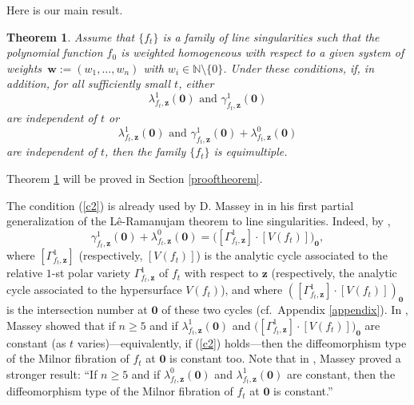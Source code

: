 \documentclass[a4paper,fleqn,11pt]{amsart}
\newtheorem{theorem}{Theorem}[section]
\theoremstyle{definition}
\theoremstyle{remark}
\numberwithin{equation}{section}
\begin{document}
Here is our main result.

\begin{theorem}\label{mt2}
Assume that $\{f_t\}$ is a family of line singularities such that the polynomial function $f_0$ is weighted homogeneous with respect to a given system of weights~$\mathbf{w}:=(w_1,\ldots,w_n)$ with $w_i\in \mathbb{N}\setminus\{0\}$. 
Under these conditions, if, in addition, 
for all sufficiently small $t$, either 
\begin{equation}\label{c1}
\lambda^1_{f_t,\mathbf{z}} (\mathbf{0}) \mbox{ and } 
\gamma^1_{f_t,\mathbf{z}} (\mathbf{0})
\end{equation} 
are independent of $t$ or 
\begin{equation}\label{c2}
\lambda^1_{f_t,\mathbf{z}} (\mathbf{0}) \mbox{ and } 
\gamma^1_{f_t,\mathbf{z}} (\mathbf{0}) + \lambda^0_{f_t,\mathbf{z}} (\mathbf{0})
\end{equation}  
are independent of $t$, then the family $\{f_t\}$ is equimultiple.
\end{theorem}

Theorem \ref{mt2} will be proved in Section \ref{prooftheorem}.

The condition (\ref{c2}) is already used by D. Massey in \cite[\S5]{M7} in his first partial generalization of the L\^e-Ramanujam theorem to line singularities. 
Indeed, by \cite[Proposition 1.23]{M}, 
\begin{displaymath}
\gamma^1_{f_t,\mathbf{z}} (\mathbf{0}) + \lambda^0_{f_t,\mathbf{z}} (\mathbf{0})
= \bigl([\Gamma^1_{f_t,\mathbf{z}}] \cdot [V(f_t)]\bigr)_{\mathbf{0}},
\end{displaymath} 
where $[\Gamma^1_{f_t,\mathbf{z}}]$ (respectively, $[V(f_t)]$) is the analytic cycle associated to the relative $1$-st polar variety $\Gamma^1_{f_t,\mathbf{z}}$ of $f_t$ with respect to $\mathbf{z}$ (respectively, the analytic cycle associated to the hypersurface $V(f_t)$), and where 
$([\Gamma^1_{f_t,\mathbf{z}}] \cdot [V(f_t)])_{\mathbf{0}}$
is the intersection number at $\mathbf{0}$ of these two cycles (cf.~Appendix \ref{appendix}). 
In \cite[Theorem (5.2)]{M7}, Massey showed that if $n\geq 5$ and if $\lambda^1_{f_t,\mathbf{z}} (\mathbf{0})$ and $\bigl([\Gamma^1_{f_t,\mathbf{z}}] \cdot [V(f_t)]\bigr)_{\mathbf{0}}$ are constant (as $t$ varies)---equivalently, if (\ref{c2}) holds---then the diffeomorphism type of the Milnor fibration of $f_t$ at $\mathbf{0}$ is constant too. Note that in \cite[Theorem 9.4]{M}, Massey proved a stronger result: ``If $n\geq 5$ and if $\lambda^0_{f_t,\mathbf{z}} (\mathbf{0})$ and $\lambda^1_{f_t,\mathbf{z}} (\mathbf{0})$ are constant, then the diffeomorphism type of the Milnor fibration of $f_t$ at $\mathbf{0}$ is constant.''
\end{document}

